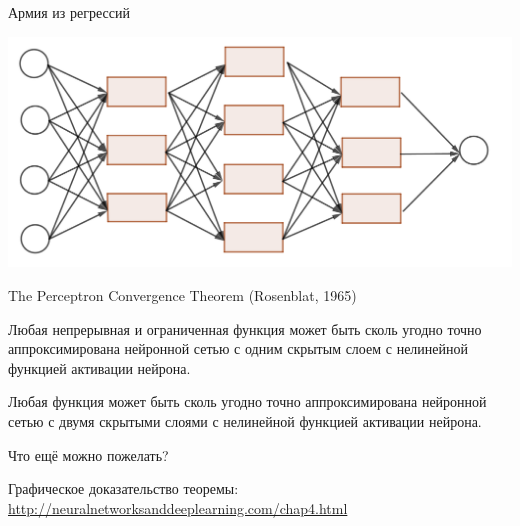 \documentclass[notes,12pt, aspectratio=169]{beamer}
\newenvironment{wideitemize}{\itemize\addtolength{\itemsep}{10pt}}{\enditemize}
\begin{document}
\begin{frame}{Армия из регрессий}
	\begin{center}
		\includegraphics[width=0.8\paperwidth]{network.png}
	\end{center}
\end{frame}


\begin{frame}{The Perceptron Convergence Theorem (Rosenblat, 1965)}
	\begin{wideitemize}
		\item Любая непрерывная и ограниченная функция может быть сколь угодно точно аппроксимирована нейронной сетью с одним скрытым слоем с нелинейной функцией активации нейрона.

		\item Любая функция может быть сколь угодно точно аппроксимирована нейронной сетью с двумя скрытыми слоями с нелинейной функцией активации нейрона.

		\item Что ещё можно пожелать?
	\end{wideitemize}

\vfill %
\footnotesize Графическое доказательство теоремы:  \\
\color{blue} \url{http://neuralnetworksanddeeplearning.com/chap4.html}
\end{frame}
\end{document}
